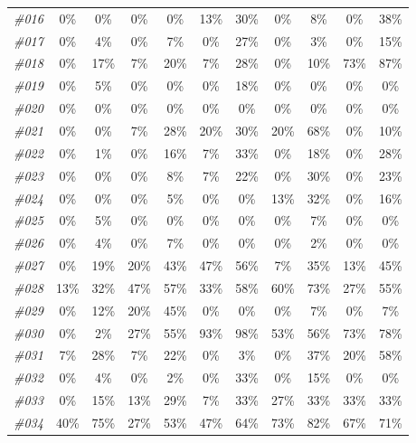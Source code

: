 \begin{table}[t]
\begin{tabular}{ccccccccccc}
    \textit{\#016} & 0\%   & 0\%   & 0\%   & 0\%   & 13\%  & 30\%  & 0\%   & 8\%   & 0\%   & 38\% \\
    \textit{\#017} & 0\%   & 4\%   & 0\%   & 7\%   & 0\%   & 27\%  & 0\%   & 3\%   & 0\%   & 15\% \\
    \textit{\#018} & 0\%   & 17\%  & 7\%   & 20\%  & 7\%   & 28\%  & 0\%   & 10\%  & 73\%  & 87\% \\
    \textit{\#019} & 0\%   & 5\%   & 0\%   & 0\%   & 0\%   & 18\%  & 0\%   & 0\%   & 0\%   & 0\% \\
    \textit{\#020} & 0\%   & 0\%   & 0\%   & 0\%   & 0\%   & 0\%   & 0\%   & 0\%   & 0\%   & 0\% \\
    \textit{\#021} & 0\%   & 0\%   & 7\%   & 28\%  & 20\%  & 30\%  & 20\%  & 68\%  & 0\%   & 10\% \\
    \textit{\#022} & 0\%   & 1\%   & 0\%   & 16\%  & 7\%   & 33\%  & 0\%   & 18\%  & 0\%   & 28\% \\
    \textit{\#023} & 0\%   & 0\%   & 0\%   & 8\%   & 7\%   & 22\%  & 0\%   & 30\%  & 0\%   & 23\% \\
    \textit{\#024} & 0\%   & 0\%   & 0\%   & 5\%   & 0\%   & 0\%   & 13\%  & 32\%  & 0\%   & 16\% \\
    \textit{\#025} & 0\%   & 5\%   & 0\%   & 0\%   & 0\%   & 0\%   & 0\%   & 7\%   & 0\%   & 0\% \\
    \textit{\#026} & 0\%   & 4\%   & 0\%   & 7\%   & 0\%   & 0\%   & 0\%   & 2\%   & 0\%   & 0\% \\
    \textit{\#027} & 0\%   & 19\%  & 20\%  & 43\%  & 47\%  & 56\%  & 7\%   & 35\%  & 13\%  & 45\% \\
    \textit{\#028} & 13\%  & 32\%  & 47\%  & 57\%  & 33\%  & 58\%  & 60\%  & 73\%  & 27\%  & 55\% \\
    \textit{\#029} & 0\%   & 12\%  & 20\%  & 45\%  & 0\%   & 0\%   & 0\%   & 7\%   & 0\%   & 7\% \\
    \textit{\#030} & 0\%   & 2\%   & 27\%  & 55\%  & 93\%  & 98\%  & 53\%  & 56\%  & 73\%  & 78\% \\
    \textit{\#031} & 7\%   & 28\%  & 7\%   & 22\%  & 0\%   & 3\%   & 0\%   & 37\%  & 20\%  & 58\% \\
    \textit{\#032} & 0\%   & 4\%   & 0\%   & 2\%   & 0\%   & 33\%  & 0\%   & 15\%  & 0\%   & 0\% \\
    \textit{\#033} & 0\%   & 15\%  & 13\%  & 29\%  & 7\%   & 33\%  & 27\%  & 33\%  & 33\%  & 33\% \\
    \textit{\#034} & 40\%  & 75\%  & 27\%  & 53\%  & 47\%  & 64\%  & 73\%  & 82\%  & 67\%  & 71\% \\

\end{tabular}
\end{table}
